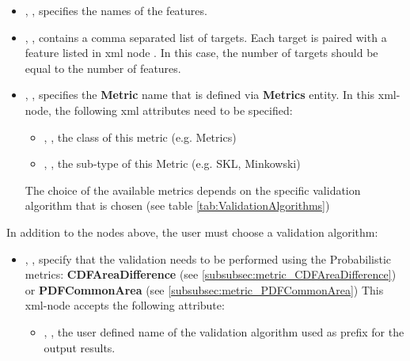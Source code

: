 %
%
\begin{itemize}
  \item {}, , specifies the names of the features.
  \item {}, , contains a comma separated list of
     targets. \nb Each target is paired with a feature listed in xml node . In this case, the
    number of targets should be equal to the number of features.
    \item {}, , specifies the \textbf{Metric} name that is defined via
    \textbf{Metrics} entity. In this xml-node, the following xml attributes need to be specified:
    \begin{itemize}
      \item {}, , the class of this metric (e.g. Metrics)
      \item {}, , the sub-type of this Metric (e.g. SKL, Minkowski)
    \end{itemize}
    The choice of the available metrics depends on the specific validation algorithm that is chosen (see table \ref{tab:ValidationAlgorithms})
\end{itemize}

In addition to the nodes above, the user must choose a validation algorithm:
\begin{itemize}
  \item {}, , specify that the validation needs to be performed
  using the Probabilistic metrics: \textbf{CDFAreaDifference} (see \ref{subsubsec:metric_CDFAreaDifference})  or \textbf{PDFCommonArea} (see \ref{subsubsec:metric_PDFCommonArea})
  This xml-node accepts the following attribute:
    \begin{itemize}
      \item {}, , the  user defined name of the validation algorithm used as prefix for the output results.
    \end{itemize}
\end{itemize}

